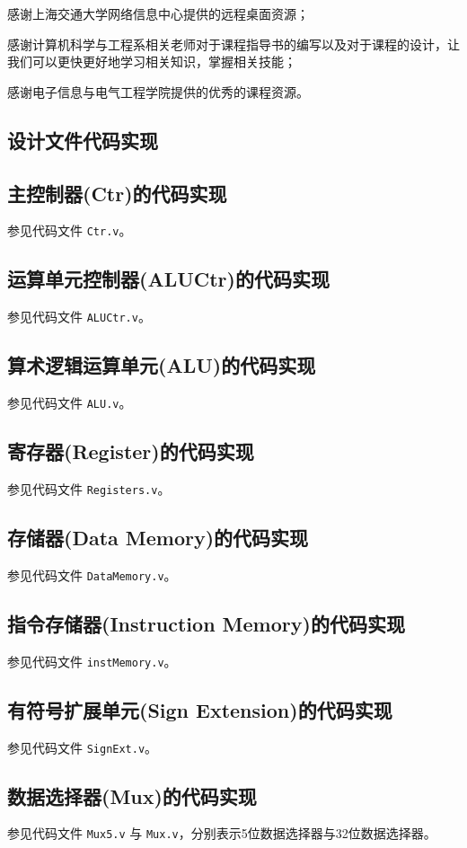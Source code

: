\documentclass{cumcm}
\numberwithin{equation}{section}
\numberwithin{equation}{subsection}
\begin{document}
感谢上海交通大学网络信息中心提供的远程桌面资源；

感谢计算机科学与工程系相关老师对于课程指导书的编写以及对于课程的设计，让我们可以更快更好地学习相关知识，掌握相关技能；

感谢电子信息与电气工程学院提供的优秀的课程资源。
%
%

\clearpage
\begin{appendices}
\section{设计文件代码实现}\label{appsection1}
\subsection{主控制器(Ctr)的代码实现}\label{appsection1.1}
参见代码文件 \texttt{Ctr.v}。
\subsection{运算单元控制器(ALUCtr)的代码实现}\label{appsection1.2}
参见代码文件 \texttt{ALUCtr.v}。
\subsection{算术逻辑运算单元(ALU)的代码实现}\label{appsection1.3}
参见代码文件 \texttt{ALU.v}。
\subsection{寄存器(Register)的代码实现}\label{appsection1.4}
参见代码文件 \texttt{Registers.v}。
\subsection{存储器(Data Memory)的代码实现}\label{appsection1.5}
参见代码文件 \texttt{DataMemory.v}。
\subsection{指令存储器(Instruction Memory)的代码实现}\label{appsection1.6}
参见代码文件 \texttt{instMemory.v}。
\subsection{有符号扩展单元(Sign Extension)的代码实现}\label{appsection1.7}
参见代码文件 \texttt{SignExt.v}。
\subsection{数据选择器(Mux)的代码实现}\label{appsection1.8}
参见代码文件 \texttt{Mux5.v} 与 \texttt{Mux.v}，分别表示5位数据选择器与32位数据选择器。

\end{appendices}
\end{document}
